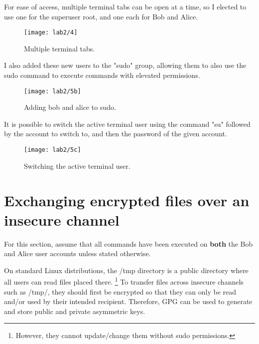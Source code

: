 
For ease of access, multiple terminal tabs can be open at a time, so I elected to use one for the superuser root,
and one each for Bob and Alice.

\begin{figure}[H]
    \centering
    \texttt{[image: lab2/4]}
    \caption{Multiple terminal tabs.}
    \label{fig:terminalTabs}
\end{figure}

I also added these new users to the "sudo" group, allowing them to also use the sudo command to execute commands
with elevated permissions.

\begin{figure}[H]
    \centering
    \texttt{[image: lab2/5b]}
    \caption{Adding bob and alice to sudo.}
    \label{fig:sudoAdd1}
\end{figure}



It is possible to switch the active terminal user using the command "su" followed by the account to switch to,
and then the password of the given account.

\begin{figure}[H]
    \centering
    \texttt{[image: lab2/5c]}
    \caption{Switching the active terminal user.}
    \label{fig:suBobAlice}
\end{figure}

\pagebreak

\section{Exchanging encrypted files over an insecure channel}\label{sec:tmpExchange}
\begin{tcolorbox}[colback=orange!5!white,colframe=orange!75!black]
    For this section, assume that all commands have been executed on \textbf{both} the Bob and Alice
    user accounts unless stated otherwise.
\end{tcolorbox}
On standard Linux distributions, the /tmp directory is a public directory where all users can read files placed there.
\footnote{However, they cannot update/change them without sudo permissions.}
To transfer files across insecure channels such as /tmp/, they should first be encrypted so that
they can only be read and/or used by their intended recipient.
Therefore, GPG can be used to generate and store public and private asymmetric keys.

